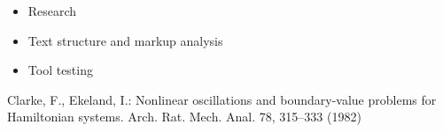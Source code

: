 \documentclass{llncs}
\begin{document}
\begin{itemize}
	\item Research
	\item Text structure and markup analysis
	\item Tool testing
\end{itemize}

%
%
\begin{thebibliography}{}
%
Clarke, F., Ekeland, I.:
Nonlinear oscillations and
boundary-value problems for Hamiltonian systems.
Arch. Rat. Mech. Anal. 78, 315--333 (1982)

\end{thebibliography}
\clearpage
{} %
\renewcommand{\indexname}{Author Index}
\printindex
\clearpage
{} %
\renewcommand{\indexname}{Subject Index}

\end{document}
